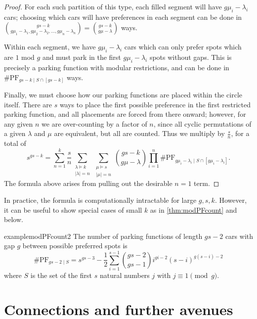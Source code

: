 \documentclass[12pt]{article}
\begin{document}
\begin{proof}
    For each such partition of this type, each filled segment will have $g\mu_i-\lambda_i$ cars; choosing which cars will have preferences in each segment can be done in $\binom{gs - k}{g \mu_1 - \lambda_1,g \mu_2 - \lambda_2,\ldots,g \mu_n - \lambda_n}=\binom{gs - k}{g \mu - \lambda}$ ways.
    
    Within each segment, we have $g\mu_i-\lambda_i$ cars which can only prefer spots which are $1$ mod $g$ and must park in the first $g\mu_i-\lambda_i$ spots without gaps. This is precisely a parking function with modular restrictions, and can be done in $\# \mathrm{PF}_{gs - k \mid S \cap [gs - k]}$ ways.

    Finally, we must choose how our parking functions are placed within the circle itself. There are $s$ ways to place the first possible preference in the first restricted parking function, and all placements are forced from there onward; however, for any given $n$ we are over-counting by a factor of $n$, since all cyclic permutations of a given $\lambda$ and $\mu$ are equivalent, but all are counted. Thus we multiply by $\frac{s}{n}$, for a total of 
    \[
	    s^{gs - k} = \sum_{n = 1}^{k} \frac{s}{n} \sum_{\substack{\lambda \vDash k \\ \lvert\lambda\rvert = n}} \sum_{\substack{\mu \vDash s \\\lvert \mu \rvert = n}} \binom{gs - k}{g \mu - \lambda} \prod_{i = 1}^{n} \# \mathrm{PF}_{g \mu_{i} - \lambda_{i} \mid S \cap [g \mu_{i} - \lambda_{i}]}.
    \]
    The formula above arises from pulling out the desirable $n = 1$ term.
\end{proof}

In practice, the formula is computationally intractable for large $g, s, k$. However, it can be useful to show special cases of small $k$ as in \cref{thm:modPFcount} and below.

\begin{restatable}{example}{modPFcount2}
	The number of parking functions of length $gs - 2$ cars with gap $g$ between possible preferred spots is
	\[
		\#\mathrm{PF}_{gs - 2 \mid S} = s^{gs - 3} - \frac{1}{2} \sum_{i = 1}^{s - 1} \binom{gs - 2}{gs - 1} i^{gi - 2} (s - i)^{g(s - i) - 2}
	\]
	where $S$ is the set of the first $s$ natural numbers $j$ with $j \equiv 1 \pmod g$.
\end{restatable}

\section{Connections and further avenues} \label{sec:connections}
\end{document}
